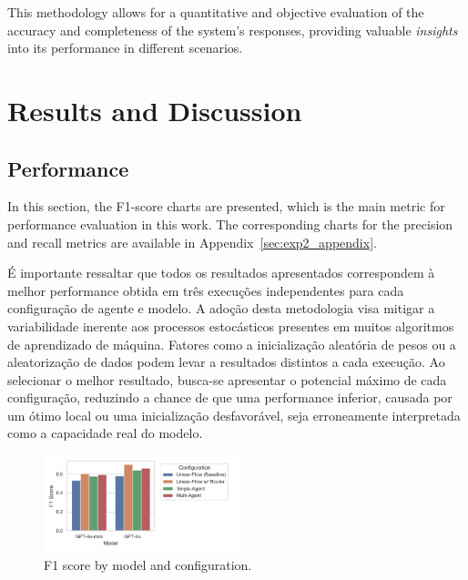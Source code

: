             This methodology allows for a quantitative and objective evaluation of the accuracy and completeness of the system's responses, providing valuable \textit{insights} into its performance in different scenarios.



            
    \section{Results and Discussion}

        
        \subsection{Performance}
        
            In this section, the F1-score charts are presented, which is the main metric for performance evaluation in this work. The corresponding charts for the precision and recall metrics are available in Appendix~\ref{sec:exp2_appendix}.
            
            É importante ressaltar que todos os resultados apresentados correspondem à melhor performance obtida em três execuções independentes para cada configuração de agente e modelo. A adoção desta metodologia visa mitigar a variabilidade inerente aos processos estocásticos presentes em muitos algoritmos de aprendizado de máquina. Fatores como a inicialização aleatória de pesos ou a aleatorização de dados podem levar a resultados distintos a cada execução. Ao selecionar o melhor resultado, busca-se apresentar o potencial máximo de cada configuração, reduzindo a chance de que uma performance inferior, causada por um ótimo local ou uma inicialização desfavorável, seja erroneamente interpretada como a capacidade real do modelo.

            \begin{figure}[h]
                \centering              
                \includegraphics[width=0.50\textwidth]{images_exp2/bar_best_f1_by_model_and_configuration.png}
                \caption{F1 score by model and configuration.}
                \label{fig:best_f1_by_model_and_configuration}
            \end{figure}


